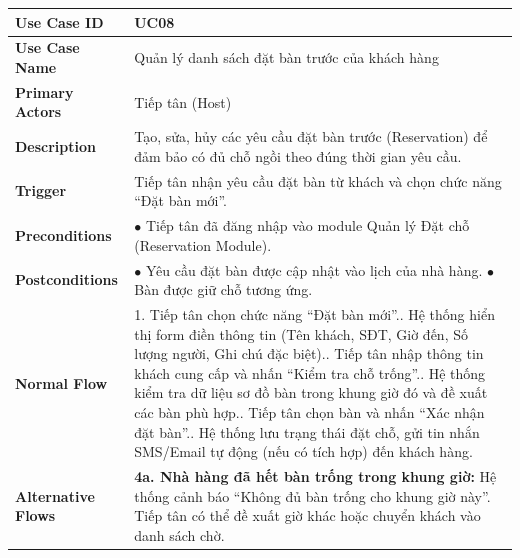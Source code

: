 \begin{longtable}{|L{3.5cm}|L{12.5cm}|}
\hline
\textbf{Use Case ID} & UC08 \\ \hline
\textbf{Use Case Name} & Quản lý danh sách đặt bàn trước của khách hàng \\ \hline
\textbf{Primary Actors} & Tiếp tân (Host) \\ \hline
\textbf{Description} & Tạo, sửa, hủy các yêu cầu đặt bàn trước (Reservation) để đảm bảo có đủ chỗ ngồi theo đúng thời gian yêu cầu. \\ \hline
\textbf{Trigger} & Tiếp tân nhận yêu cầu đặt bàn từ khách và chọn chức năng ``Đặt bàn mới''. \\ \hline
\textbf{Preconditions} & $\bullet$ Tiếp tân đã đăng nhập vào module Quản lý Đặt chỗ (Reservation Module). \\ \hline
\textbf{Postconditions} &
$\bullet$ Yêu cầu đặt bàn được cập nhật vào lịch của nhà hàng.\newline
$\bullet$ Bàn được giữ chỗ tương ứng. \\ \hline
\textbf{Normal Flow} &
1. Tiếp tân chọn chức năng ``Đặt bàn mới''.. Hệ thống hiển thị form điền thông tin (Tên khách, SĐT, Giờ đến, Số lượng người, Ghi chú đặc biệt).. Tiếp tân nhập thông tin khách cung cấp và nhấn ``Kiểm tra chỗ trống''.. Hệ thống kiểm tra dữ liệu sơ đồ bàn trong khung giờ đó và đề xuất các bàn phù hợp.. Tiếp tân chọn bàn và nhấn ``Xác nhận đặt bàn''.. Hệ thống lưu trạng thái đặt chỗ, gửi tin nhắn SMS/Email tự động (nếu có tích hợp) đến khách hàng. \\ \hline
\textbf{Alternative Flows} &
\textbf{4a. Nhà hàng đã hết bàn trống trong khung giờ:} Hệ thống cảnh báo ``Không đủ bàn trống cho khung giờ này''. Tiếp tân có thể đề xuất giờ khác hoặc chuyển khách vào danh sách chờ. \\ \hline
\end{longtable}

